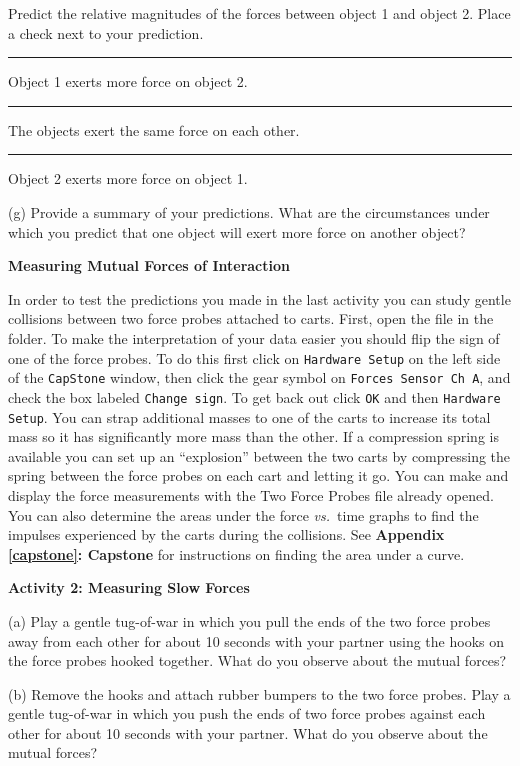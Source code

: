 \leftskip=1cm

Predict the relative magnitudes of the forces between object 1 and object 2.
Place a check next to your prediction. 

\rule{0.5in}{0.1pt} Object 1 exerts more force on object 2. 

\rule{0.5in}{0.1pt} The objects exert the same force on each other. 

\rule{0.5in}{0.1pt} Object 2 exerts more force on object 1.

\leftskip=0cm

\bigskip
(g) Provide a summary of your predictions. What are the circumstances under
which you predict that one object will exert more force on another object?
\answerspace{30mm}

\textbf{Measuring Mutual Forces of Interaction }

In order to test the predictions you made in the last activity you can study
gentle collisions between two force probes attached to carts. First, open the file 
in the \filename{\coursefolder} folder. 
To make the interpretation of your data easier you should flip the sign of one of the force probes.
To do this  first click on {\tt Hardware Setup} on the left
side of the {\tt CapStone} window, then click the gear symbol on {\tt Forces Sensor Ch A},
and check the box labeled {\tt Change sign}.
To get back out click {\tt OK} and then {\tt Hardware Setup}.
You can strap additional masses to one of the carts to increase its total mass so it has significantly
more mass than the other. 
If a compression spring is available you can set up
an ``explosion'' between the two carts by compressing the spring
between the force probes on each cart and letting it go. 
You can make and display the force measurements with the Two Force Probes file already opened. 
You can also determine the areas under the force \textit{vs.}~time graphs to find the impulses 
experienced by the carts during the collisions. 
See \textbf{Appendix \ref{capstone}: Capstone} for instructions on finding the area under a curve.

\textbf{Activity 2: Measuring Slow Forces} 

(a) Play a gentle tug-of-war in which you pull the ends of the two force probes away from each other 
for about 10 seconds with your partner using the hooks on the force probes hooked together. 
What do you observe about the mutual forces?
\answerspace{20mm}

(b) Remove the hooks and attach rubber bumpers to the two force probes. 
Play a gentle tug-of-war in which you push the ends of two force probes against each other 
for about 10 seconds with your partner. What do you observe about the mutual forces?
\answerspace{20mm}

